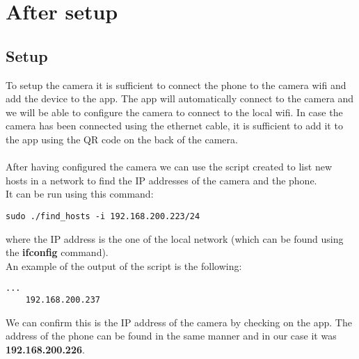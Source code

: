 \chapter{After setup}

\section{Setup}
To setup the camera it is sufficient to connect the phone to the camera wifi
and add the device to the app. The app will automatically connect to the camera
and we will be able to configure the camera to connect to the local wifi.
In case the camera has been connected using the ethernet cable, it is
sufficient to add it to the app using the QR code on the back of the camera.\\\\
After having configured the camera we can use the script created to list new hosts
in a network to find the IP addresses of the camera and the phone.\\
It can be run using this command:
\begin{lstlisting}[numbers=none]
    sudo ./find_hosts -i 192.168.200.223/24
\end{lstlisting}
where the IP address is the one of the local network (which
can be found using the \textbf{ifconfig} command).\\
An example of the output of the script is the following:
\begin{lstlisting}[numbers=none]
    ...
    192.168.200.237
\end{lstlisting}
We can confirm this is the IP address of the camera by checking on
the app. The address of the phone can be found in the same manner and in our case
it was \textbf{192.168.200.226}.\\
